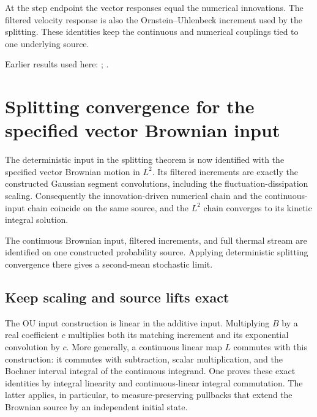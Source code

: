 \documentclass[11pt,a4paper]{report}
\begin{document}
At the step endpoint the vector responses equal the numerical innovations. The filtered velocity response is also the Ornstein–Uhlenbeck increment used by the splitting. These identities keep the continuous and numerical couplings tied to one underlying source.



Earlier results used here: \cite[Section~3.8.16]{LangevinLean2026ULASC}; \cite[Section~3.8.17]{LangevinLean2026ULASC}.
\section{\texorpdfstring{Splitting convergence for the specified vector Brownian input}{Splitting convergence for the specified vector Brownian input}}
\label{proof-module-KineticLangevin-CanonicalSplitting-lean}


The deterministic input in the splitting theorem is now identified with the specified vector Brownian motion in \(L^{2}\). Its filtered increments are exactly the constructed Gaussian segment convolutions, including the fluctuation-dissipation scaling. Consequently the innovation-driven numerical chain and the continuous-input chain coincide on the same source, and the \(L^{2}\) chain converges to its kinetic integral solution.



The continuous Brownian input, filtered increments, and full thermal stream are identified on one constructed probability source. Applying deterministic splitting convergence there gives a second-mean stochastic limit.

\subsection{\texorpdfstring{Keep scaling and source lifts exact}{Keep scaling and source lifts exact}}
\label{report-step-KineticLangevin-CanonicalSplitting-lean-1}


The OU input construction is linear in the additive input. Multiplying \(B\) by a real coefficient \(c\) multiplies both its matching increment and its exponential convolution by \(c\). More generally, a continuous linear map \(L\) commutes with this construction: it commutes with subtraction, scalar multiplication, and the Bochner interval integral of the continuous integrand. One proves these exact identities by integral linearity and continuous-linear integral commutation. The latter applies, in particular, to measure-preserving pullbacks that extend the Brownian source by an independent initial state.
\end{document}
